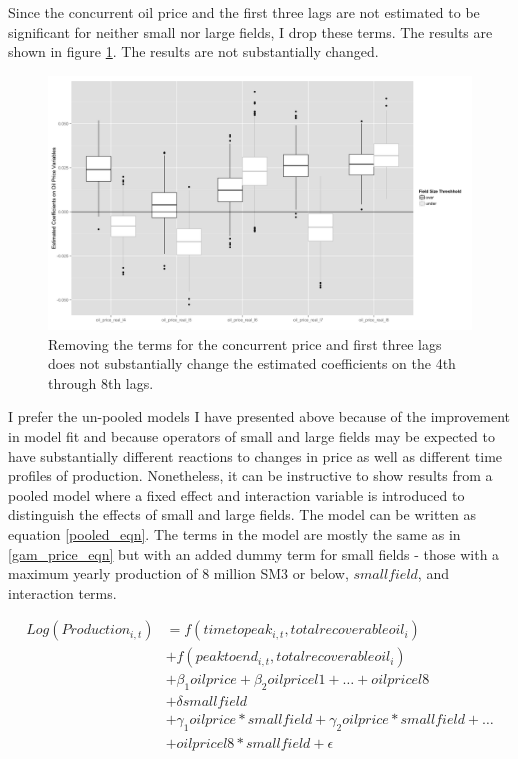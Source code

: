 \documentclass[12pt]{article}
\begin{document}
Since the concurrent oil price and the first three lags are not estimated to be significant for neither small nor large fields, I drop these terms.  The results are shown in figure \ref{gam_price_short}.  The results are not substantially changed.  

\begin{figure}
	\includegraphics[width=1\textwidth]{figures/gam_price_short_print.png}
	\caption{Removing the terms for the concurrent price and first three lags does not substantially change the estimated coefficients on the 4th through 8th lags.}
	\label{gam_price_short}
\end{figure}

I prefer the un-pooled models I have presented above because of the improvement in model fit and because operators of small and large fields may be expected to have substantially different reactions to changes in price as well as different time profiles of production. Nonetheless, it can be instructive to show results from a pooled model where a fixed effect and interaction variable is introduced to distinguish the effects of small and large fields. The model can be written as equation \ref{pooled_eqn}.  The terms in the model are mostly the same as in \ref{gam_price_eqn} but with an added dummy term for small fields - those with a maximum yearly production of 8 million SM3 or below, $smallfield$, and interaction terms.  

\begin{equation}
\begin{split}
	Log(Production_{i,t})&=f(timetopeak_{i,t}, totalrecoverableoil_i) \\
	 \quad & + f(peaktoend_{i,t}, totalrecoverableoil_i) \\
	 \quad & + \beta_1 oilprice + \beta_2 oilpricel1 + \dots + oilpricel8\\
	 \quad & + \delta smallfield \\
 	 \quad & + \gamma_1 oilprice*smallfield + \gamma_2 oilprice*smallfield + \dots \\
 	 \quad & + oilpricel8*smallfield +  \epsilon
\label{pooled_eqn}
\end{split}
\end{equation}
\end{document}
